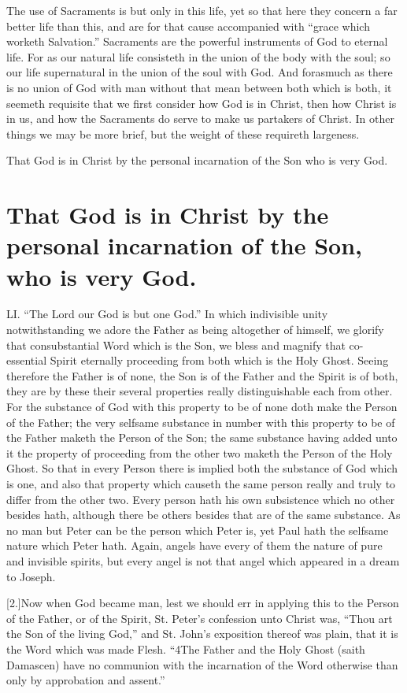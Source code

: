 The use of Sacraments is but only in this life, yet so that here they concern a far better life than this, and are for that cause accompanied with “grace which worketh Salvation.” Sacraments are the powerful instruments of God to eternal life. For as our natural life consisteth in the union of the body with the soul; so our life supernatural in the union of the soul with God. And forasmuch as there is no union of God with man without that mean between both which is both, it seemeth requisite that we first consider how God is in Christ, then how Christ is in us, and how the Sacraments do serve to make us partakers of Christ. In other things we may be more brief, but the weight of these requireth largeness.


That God is in Christ by the personal incarnation of the Son who is very God.
\section*{That God is in Christ by the personal incarnation of the Son, who is very God.}
LI. “The Lord our God is but one God.” In which indivisible unity notwithstanding we adore the Father as being altogether of himself, we glorify that consubstantial Word which is the Son, we bless and magnify that co-essential Spirit eternally proceeding from both which is the Holy Ghost. Seeing therefore the Father is of none, the Son is of the Father and the Spirit is of both, they are by these their several properties really distinguishable each from other. For the substance of God with this property to be of none doth make the Person of the Father; the very selfsame substance in number with this property to be of the Father maketh the Person of the Son; the same substance having added unto it the property of proceeding from the other two maketh the Person of the Holy Ghost. So that in every Person there is implied both the substance of God which is one, and  also that property which causeth the same person really and truly to differ from the other two.
 Every person hath his own subsistence which no other besides hath, although there be others besides that are of the same substance. As no man but Peter can be the person which Peter is, yet Paul hath the selfsame nature which Peter hath. Again, angels have every of them the nature of pure and invisible spirits, but every angel is not that angel which appeared in a dream to Joseph.

[2.]Now when God became man, lest we should err in applying this to the Person of the Father, or of the Spirit, St. Peter’s confession unto Christ was, “Thou art the Son of the living God,” and St. John’s exposition thereof was plain, that it is the Word which was made Flesh. “4The Father and the Holy Ghost (saith Damascen) have no communion with the incarnation of the Word otherwise than only by approbation and assent.”

